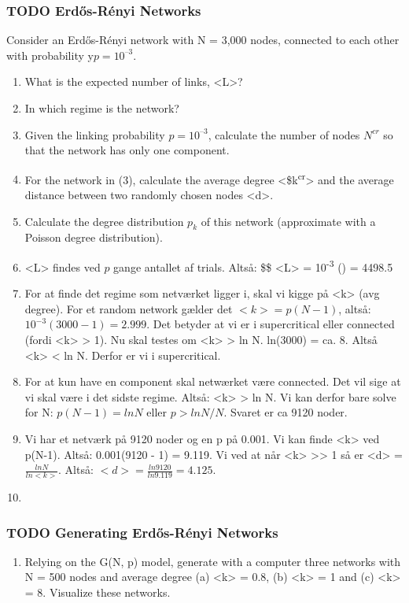 \documentclass[11pt]{article}
\begin{document}
\subsubsection{{\bfseries\sffamily TODO} Erdős-Rényi Networks}
\label{sec:orge88f88b}
Consider an Erdős-Rényi network with N = 3,000 nodes, connected to each other with probability y\(p = 10^{–3}\).
\begin{enumerate}
\item What is the expected number of links, <L>?
\item In which regime is the network?
\item Given the linking probability \(p = 10^{–3}\), calculate the number of nodes \(N^{cr}\) so that the network has only one component.
\item For the network in (3), calculate the average degree <\$k\textsuperscript{cr}> and the average distance between two randomly chosen nodes <d>.
\item Calculate the degree distribution \(p_k\) of this network (approximate with a Poisson degree distribution).

\item <L> findes ved \(p\) gange antallet af trials. Altså: \$\$ <L> = 10\textsuperscript{-3} () = 4498.5
\item For at finde det regime som netværket ligger i, skal vi kigge på <k> (avg degree). For et random network gælder det \(<k> = p(N-1)\), altså: \(10^{-3}(3000-1) = 2.999\). Det betyder at vi er i supercritical eller connected (fordi <k> > 1). Nu skal testes om <k> > ln N. ln(3000) = ca. 8. Altså <k> < ln N. Derfor er vi i supercritical.
\item For at kun have en component skal netwærket være connected. Det vil sige at vi skal være i det sidste regime. Altså: <k> > ln N. Vi kan derfor bare solve for N: \(p(N - 1) = ln N\) eller \(p > ln N/N\). Svaret er ca 9120 noder.
\item Vi har et netværk på 9120 noder og en p på 0.001. Vi kan finde <k> ved p(N-1). Altså: 0.001(9120 - 1) = 9.119. Vi ved at når <k> >> 1 så er <d> = \(\frac{ln N}{ln <k>}\). Altså: \(<d> = \frac{ln 9120}{ln 9.119} = 4.125\).
\item 
\end{enumerate}

\subsubsection{{\bfseries\sffamily TODO} Generating Erdős-Rényi Networks}
\label{sec:orgc3c90ff}
\begin{enumerate}
\item Relying on the G(N, p) model, generate with a computer three networks with N = 500 nodes and average degree (a) <k> = 0.8, (b) <k> = 1 and (c) <k> = 8. Visualize these networks.
\end{enumerate}
\end{document}
